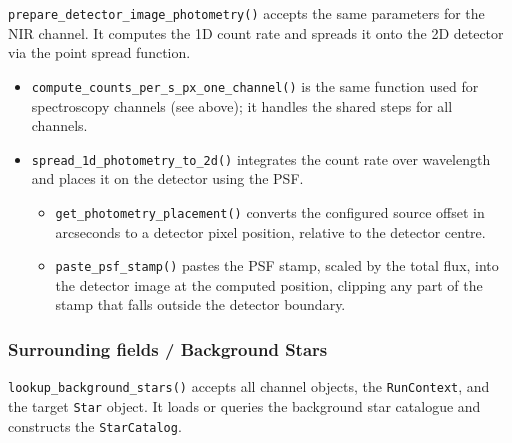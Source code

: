 \texttt{prepare\_detector\_image\_photometry()} accepts the same parameters for the NIR channel. It computes the 1D count rate and spreads it onto the 2D detector via the point spread function.
\begin{itemize}
    \item \texttt{compute\_counts\_per\_s\_px\_one\_channel()} is the same function used for spectroscopy channels (see above); it handles the shared steps for all channels.

    \item \texttt{spread\_1d\_photometry\_to\_2d()} integrates the count rate over wavelength and places it on the detector using the PSF.
          \begin{itemize}
              \item \texttt{get\_photometry\_placement()} converts the configured source offset in arcseconds to a detector pixel position, relative to the detector centre.
              \item \texttt{paste\_psf\_stamp()} pastes the PSF stamp, scaled by the total flux, into the detector image at the computed position, clipping any part of the stamp that falls outside the detector boundary.
          \end{itemize}
\end{itemize}

\subsubsection{Surrounding fields / Background Stars}
\label{sec:background_star_loading}

\texttt{lookup\_background\_stars()} accepts all channel objects, the \texttt{RunContext}, and the target \texttt{Star} object. It loads or queries the background star catalogue and constructs the \texttt{StarCatalog}.

